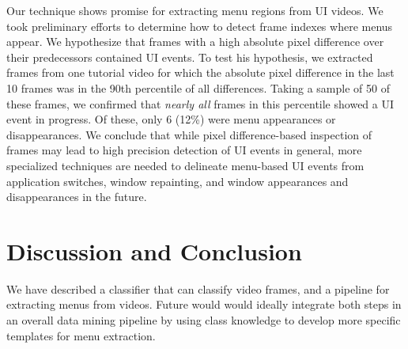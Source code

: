 \documentclass[10pt]{article}
\begin{document}
Our technique shows promise for extracting menu regions from UI videos.  We took preliminary efforts
to determine how to detect frame indexes where menus appear.  We hypothesize that frames with a 
high absolute pixel difference over their predecessors contained UI events.  To test his hypothesis, 
we extracted frames from one tutorial video for which the absolute pixel difference in the last 10
frames was in the 90th percentile of all differences.  Taking a sample of 50 of these frames, we confirmed that
\emph{nearly all} frames in this percentile showed a UI event in progress.  Of these, only 6 (12\%) 
were menu appearances or disappearances.  We conclude that while pixel difference-based inspection of frames may lead to
high precision detection of UI events in general, more specialized techniques are needed to
delineate menu-based UI events from application switches, window repainting, and window
appearances and disappearances in the future.

\section{Discussion and Conclusion}

We have described a classifier that can classify video frames, and a pipeline for extracting menus
from videos. Future would would ideally integrate both steps in an overall data mining pipeline by
using class knowledge to develop more specific templates for menu extraction.

\printbibliography
\end{document}
